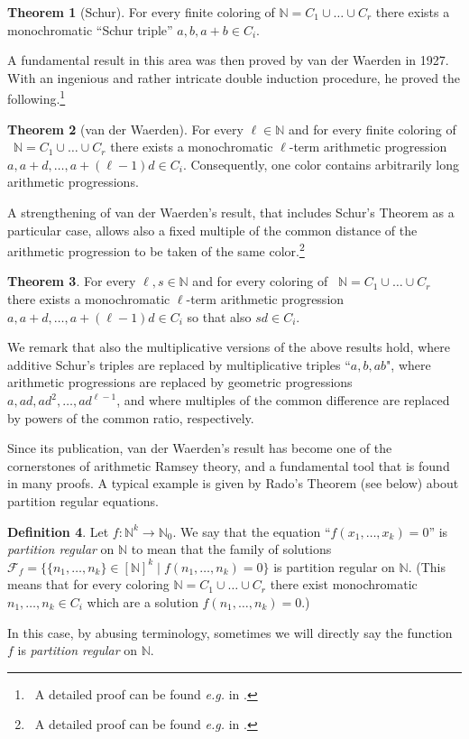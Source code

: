 \documentclass[a4paper,oneside]{article}
\newcommand{\N}{\mathbb{N}}
\newcommand{\F}{\mathcal{F}}
\theoremstyle{definition}
\newtheorem{theorem}{Theorem}[section]
\newtheorem{definition}[theorem]{Definition}
\theoremstyle{named}
\begin{document}
\begin{theorem}[Schur]\label{schur}
For every finite coloring of $\N=C_1\cup\ldots\cup C_r$ there exists a monochromatic ``Schur triple'' 
$a, b, a+b \in C_i$.
\end{theorem}

A fundamental result in this area was then proved by van der Waerden \cite{vdw} in 1927.
With an ingenious and rather intricate double induction procedure, he proved the following.\footnote
{~A detailed proof can be found \emph{e.g.} in \cite[\S 2.1]{grs}.}

\begin{theorem}[van der Waerden]
For every $\ell\in\N$ and for every finite coloring of \, $\N=C_1\cup\ldots\cup C_r$ 
there exists a monochromatic $\ell$-term arithmetic progression
$a, a+d, \ldots, a+(\ell-1)d\in C_i$. Consequently, one color contains arbitrarily long
arithmetic progressions.
\end{theorem}

A strengthening of van der Waerden's result, that includes Schur's Theorem as a particular case, allows also a fixed multiple of the common distance of the arithmetic progression to be taken of the same color.\footnote
{~A detailed proof can be found \emph{e.g.} in \cite[\S 2.2]{grs}.}


\begin{theorem}\label{vdWB}
For every $\ell,s\in\N$ and for every coloring of \, $\N=C_1\cup\ldots\cup C_r$ 
there exists a monochromatic $\ell$-term arithmetic progression
$a, a+d, \ldots, a+(\ell-1)d\in C_i$ so that also $sd\in C_i$.
\end{theorem}

We remark that also the multiplicative versions of the above results hold,
where additive Schur's triples are replaced by multiplicative triples ``$a, b, ab$",
where arithmetic progressions are replaced by geometric
progressions $a, ad, ad^2,\ldots, ad^{\ell-1}$, and where multiples of the common difference are replaced by powers of the common ratio, respectively.

\smallskip
Since its publication, van der Waerden's result
has become one of the cornerstones of arithmetic Ramsey theory,
and a fundamental tool that is found in many proofs. 
A typical example is given by Rado's Theorem (see below)
about partition regular equations.


\begin{definition}
{\rm Let $f:\N^{k}\rightarrow\N_{0}$.
We say that the equation ``$f(x_1,\ldots,x_k)=0$''
is \emph{partition regular} on $\N$ to mean that the family of solutions
$\F_f=\{\{n_1,\ldots,n_k\}\in[\N]^k\mid f(n_1,\ldots,n_k)=0\}$ is partition regular on $\N$.
(This means that for every coloring $\N=C_1\cup\ldots\cup C_r$ there exist
monochromatic $n_1,\ldots,n_k\in C_i$ which are a solution $f(n_1,\ldots,n_k)=0$.)

In this case, by abusing terminology, sometimes we will directly say
the function $f$ is \emph{partition regular} on $\N$.}
\end{definition}
\end{document}

